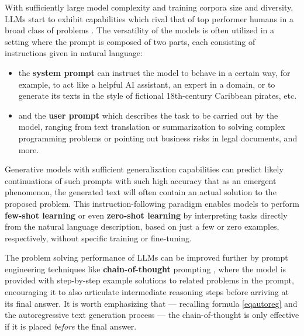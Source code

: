 \documentclass[noindent,nohyp,parspace,titlepage,twoside,12pt]{article}
\begin{document}
      With sufficiently large model complexity and training corpora size and
      diversity, LLMs start to exhibit capabilities which rival that of top
      performer humans in a broad class of problems \cite{gpt3,gpt4}. The
      versatility of the models is often utilized in a setting where the prompt
      is composed of two parts, each consisting of instructions given in
      natural language:

      \begin{itemize}
        \item the \textbf{system prompt} can instruct the model to behave in a
              certain way, for example, to act like a helpful AI assistant,
              an expert in a domain, or to generate its texts in the style of
              fictional 18th-century Caribbean pirates, etc.

        \item and the \textbf{user prompt} which describes the task to be
              carried out by the model, ranging from text translation or
              summarization to solving complex programming problems or pointing
              out business risks in legal documents, and more.
      \end{itemize}

      Generative models with sufficient generalization capabilities can predict
      likely continuations of such prompts with such high accuracy that as an
      emergent phenomenon, the generated text will often contain an actual
      solution to the proposed problem. This instruction-following paradigm
      enables models to perform \textbf{few-shot learning} \cite{gpt3} or even
      \textbf{zero-shot learning} by interpreting tasks directly from the
      natural language description, based on just a few or zero examples,
      respectively, without specific training or fine-tuning.

      The problem solving performance of LLMs can be improved further by
      prompt engineering techniques like \textbf{chain-of-thought} prompting
      \cite{cot}, where the model is provided with step-by-step example
      solutions to related problems in the prompt, encouraging it to also
      articulate intermediate reasoning steps before arriving at its final
      answer. It is worth emphasizing that --- recalling formula
      \ref{eqautoreg} and the autoregressive text generation process --- the
      chain-of-thought is only effective if it is placed \emph{before} the
      final answer.
\end{document}
